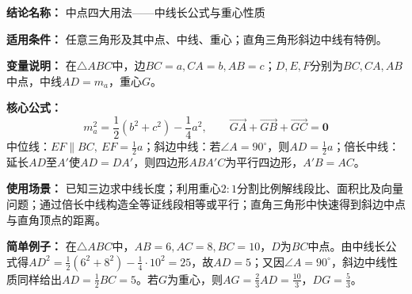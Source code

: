 \textbf{结论名称：} 中点四大用法——中线长公式与重心性质

\textbf{适用条件：} 任意三角形及其中点、中线、重心；直角三角形斜边中线有特例。

\textbf{变量说明：} 在$\triangle ABC$中，边$BC=a,CA=b,AB=c$；$D,E,F$分别为$BC,CA,AB$中点，中线$AD=m_a$，重心$G$。

\textbf{核心公式：}
\[
\boxed{m_a^{2} = \frac{1}{2}(b^{2}+c^{2})-\frac{1}{4}a^{2}},\qquad
\boxed{\overrightarrow{GA}+\overrightarrow{GB}+\overrightarrow{GC}=\mathbf{0}}
\]
中位线：$EF\parallel BC,\ EF=\frac{1}{2}a$；斜边中线：若$\angle A=90^{\circ}$，则$AD=\frac{1}{2}a$；倍长中线：延长$AD$至$A'$使$AD=DA'$，则四边形$ABA'C$为平行四边形，$A'B=AC$。

\textbf{使用场景：} 已知三边求中线长度；利用重心$2:1$分割比例解线段比、面积比及向量问题；通过倍长中线构造全等证线段相等或平行；直角三角形中快速得到斜边中点与直角顶点的距离。

\textbf{简单例子：} 在$\triangle ABC$中，$AB=6,AC=8,BC=10$，$D$为$BC$中点。由中线长公式得$AD^{2}=\frac{1}{2}(6^{2}+8^{2})-\frac{1}{4}\cdot 10^{2}=25$，故$AD=5$；又因$\angle A=90^{\circ}$，斜边中线性质同样给出$AD=\frac{1}{2}BC=5$。若$G$为重心，则$AG=\frac{2}{3}AD=\frac{10}{3}$，$DG=\frac{5}{3}$。